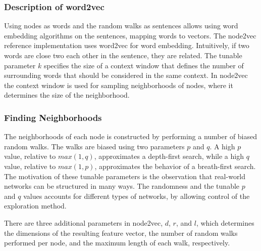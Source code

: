 \subsubsection{Description of word2vec}
Using nodes as words and the random walks as sentences allows using word embedding algorithms on the sentences, mapping words to vectors. The node2vec reference implementation uses word2vec for word embedding. Intuitively, if two words are close two each other in the sentence, they are related. The tunable parameter $k$ specifies the size of a context window that defines the number of surrounding words that should be considered in the same context. In node2vec the context window is used for sampling neighborhoods of nodes, where it determines the size of the neighborhood.

\subsubsection{Finding Neighborhoods}
The neighborhoods of each node is constructed by performing a number of biased random walks. The walks are biased using two parameters $p$ and $q$. A high $p$ value, relative to $max(1,q)$, approximates a depth-first search, while a high $q$ value, relative to $max(1,p)$, approximates the behavior of a breath-first search. The motivation of these tunable parameters is the observation that real-world networks can be structured in many ways. The randomness and the tunable $p$ and $q$ values accounts for different types of networks, by allowing control of the exploration method.

There are three additional parameters in node2vec, $d$, $r$, and $l$, which determines the dimensions of the resulting feature vector, the number of random walks performed per node, and the maximum length of each walk, respectively.

